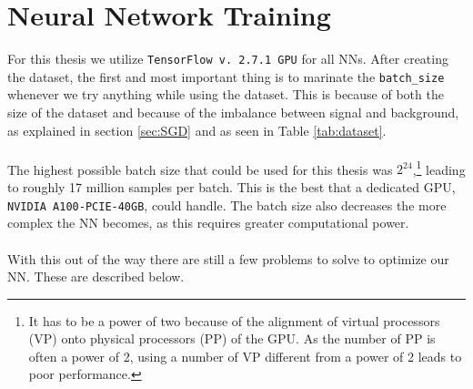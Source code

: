 \documentclass[14pt, a4paper]{book}
\begin{document}
\clearpage
\section{Neural Network Training}
For this thesis we utilize \verb|TensorFlow v. 2.7.1 GPU| for all NNs. After creating the dataset, the first and most important thing is to marinate the \verb|batch_size| whenever we try anything while using the dataset. This is because of both the size of the dataset 
and because of the imbalance between signal and background, as explained in section \ref{sec:SGD} and as seen in Table \ref{tab:dataset}.\\
\\The highest possible batch size that could be used for this thesis was $2^{24}$,\footnote{It has to be a power of two because of the alignment of virtual processors (VP) onto physical processors (PP) of the GPU. As the number of PP is often a power of 2, using a number of VP different from a power of 2 leads to poor performance.} 
leading to roughly 17 million samples per batch. This is the best that a dedicated GPU, \verb|NVIDIA A100-PCIE-40GB|, could handle. The batch size also decreases the more complex the NN becomes, as this requires greater computational power.\\
\\With this out of the way there are still a few problems to solve to optimize our NN. These are described below.
\end{document}
